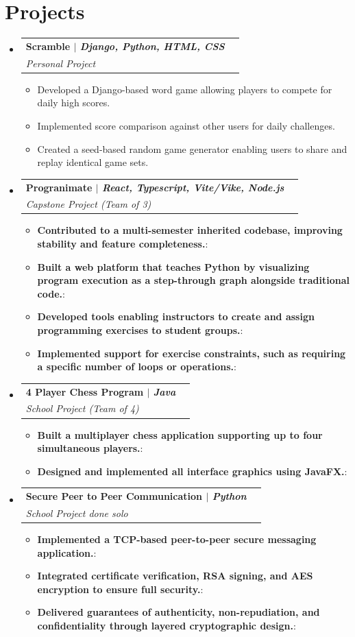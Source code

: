 \documentclass[letterpaper,11pt]{article}
\makeatletter
\newcommand{\resumeItem}[2]{
  \item\small{
    \textbf{#1}{: #2 \vspace{-2pt}}
  }
}
\newcommand{\resumeSubheading}[4]{
  \vspace{-1pt}\item
    \begin{tabular*}{0.97\textwidth}[t]{l@{\extracolsep{\fill}}r}
      \textbf{#1} & #2 \\
      \textit{\small#3} & \textit{\small #4} \\
    \end{tabular*}\vspace{-5pt}
}
\newcommand{\resumeSubheadingListStart}{\begin{itemize}[leftmargin=*]}
\newcommand{\resumeSubheadingListEnd}{\end{itemize}}
\newcommand{\resumeItemListStart}{\begin{itemize}}
\newcommand{\resumeItemListEnd}{\end{itemize}\vspace{-5pt}}
\makeatother
\begin{document}
\section{Projects}
    \resumeSubheadingListStart
        \resumeSubheading
            {\textbf{Scramble} $|$ \emph{Django, Python, HTML, CSS}}{}
            {Personal Project}{}
            \resumeItemListStart
                \item {Developed a Django-based word game allowing players to compete for daily high scores.} \\
                \item {Implemented score comparison against other users for daily challenges.} \\
                \item {Created a seed-based random game generator enabling users to share and replay identical game sets.}{}
            \resumeItemListEnd
        \resumeSubheading
            {\textbf{Progranimate} $|$ \emph{React, Typescript, Vite/Vike, Node.js}}{}
            {Capstone Project (Team of 3)}{}
            \resumeItemListStart
                \resumeItem{Contributed to a multi-semester inherited codebase, improving stability and feature completeness.} \\
                \resumeItem{Built a web platform that teaches Python by visualizing program execution as a step-through graph alongside traditional code.} \\
                \resumeItem{Developed tools enabling instructors to create and assign programming exercises to student groups.} \\
                \resumeItem{Implemented support for exercise constraints, such as requiring a specific number of loops or operations.}{}
            \resumeItemListEnd
        \resumeSubheading
            {\textbf{4 Player Chess Program} $|$ \emph{Java}}{}
            {School Project (Team of 4)}{}
            \resumeItemListStart
                \resumeItem{Built a multiplayer chess application supporting up to four simultaneous players.} \\
                \resumeItem{Designed and implemented all interface graphics using JavaFX.}{}
            \resumeItemListEnd
        \resumeSubheading
            {\textbf{Secure Peer to Peer Communication} $|$ \emph{Python}}{}
            {School Project done solo}{}
            \resumeItemListStart
                \resumeItem{Implemented a TCP-based peer-to-peer secure messaging application.} \\
                \resumeItem{Integrated certificate verification, RSA signing, and AES encryption to ensure full security.} \\
                \resumeItem{Delivered guarantees of authenticity, non-repudiation, and confidentiality through layered cryptographic design.}{}
            \resumeItemListEnd
    \resumeSubheadingListEnd
\end{document}
